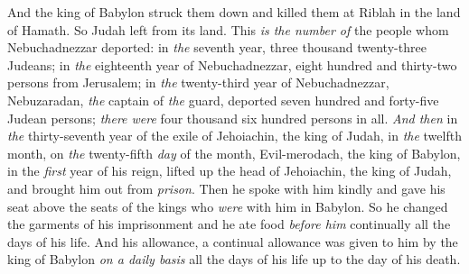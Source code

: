 \begin{biblechapter}
\verse And the king of Babylon struck them down and killed them at Riblah in the land of Hamath. So Judah left from its land.
\verse This \textit{is the number of} the people whom Nebuchadnezzar deported: in \textit{the} seventh year, three thousand twenty-three Judeans;
\verse in \textit{the} eighteenth year of Nebuchadnezzar, eight hundred and thirty-two persons from Jerusalem;
\verse in \textit{the} twenty-third year of Nebuchadnezzar, Nebuzaradan, \textit{the} captain of \textit{the} guard, deported seven hundred and forty-five Judean persons; \textit{there were} four thousand six hundred persons in all.
 \textit{And then} in \textit{the} thirty-seventh year of the exile of Jehoiachin, the king of Judah, in \textit{the} twelfth month, on \textit{the} twenty-fifth \textit{day} of the month, Evil-merodach, the king of Babylon, in the \textit{first} year of his reign, lifted up the head of Jehoiachin, the king of Judah, and brought him out from \textit{prison}.
\verse Then he spoke with him kindly and gave his seat above the seats of the kings who \textit{were} with him in Babylon.
\verse So he changed the garments of his imprisonment and he ate food \textit{before him} continually all the days of his life.
\verse And his allowance, a continual allowance was given to him by the king of Babylon \textit{on a daily basis} all the days of his life up to the day of his death.
\end{biblechapter}


